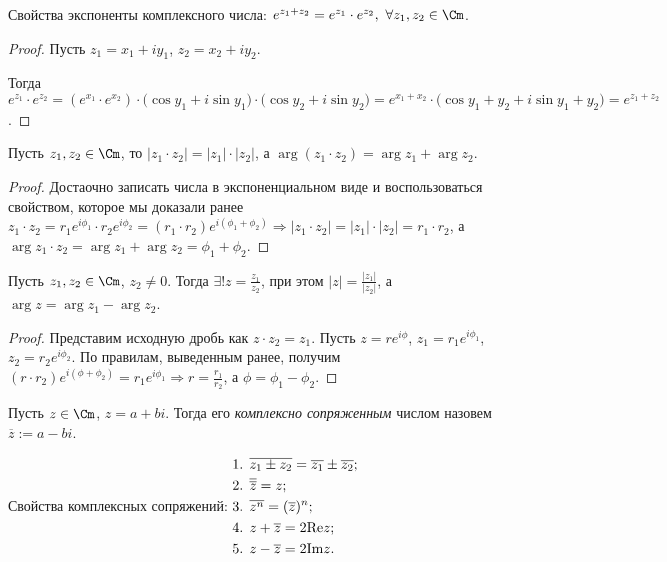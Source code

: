 Свойства экспоненты комплексного числа:
$e^{z_{1} + z_{2}} = e^{z_{1}} \cdot e^{z_{2}}, \  \forall z_{1}, z_{2} \in \Cm$.
\begin{proof}
    Пусть $z_{1} = x_{1} + i y_{1}$, $z_{2} = x_{2} + i y_{2}$.
    
    Тогда $e^{z_{1}} \cdot e^{z_{2}} = (e^{x_{1}} \cdot e^{x_{2}}) \cdot \big( \cos{y_{1}} + i \sin{y_{1}} \big) \cdot \big( \cos{y_{2}} + i \sin{y_{2}} \big) = e^{x_{1} + x_{2}} \cdot \big( \cos{y_{1} + y_{2}} + i \sin{y_{1} + y_{2}} \big) = e^{z_{1} + z_{2}}$.
\end{proof}
\begin{corollary}
    Пусть $z_{1}, z_{2} \in \Cm$, то $|z_{1} \cdot z_{2}| = |z_{1}| \cdot |z_{2}|$, а $\arg{(z_{1} \cdot z_{2})} = \arg{z_{1}} + \arg{z_{2}}$.
\end{corollary}
\begin{proof}
    Достаочно записать числа в экспоненциальном виде и воспользоваться свойством, которое мы доказали ранее $z_{1} \cdot z_{2} = r_{1} e^{i \phi_{1}} \cdot r_{2} e^{i \phi_{2}} = (r_{1} \cdot r_{2}) e^{i (\phi_{1} + \phi_{2})} \Rightarrow |z_{1} \cdot z_{2}| = |z_{1}| \cdot |z_{2}| = r_{1} \cdot r_{2}$, а $\arg{z_{1} \cdot z_{2}} = \arg{z_{1}} + \arg{z_{2}} = \phi_{1} + \phi_{2}$.
\end{proof}
\begin{corollary}
    Пусть $z_{1}, z_{2} \in \Cm$, $z_{2} \neq 0$. Тогда $\displaystyle \exists! z = \frac{z_{1}}{z_{2}}$, при этом $\displaystyle |z| = \frac{|z_{1}|}{|z_{2}|}$, а $\arg{z} = \arg{z_{1}} - \arg{z_{2}}$.
\end{corollary}
\begin{proof}
    Представим исходную дробь как $z \cdot z_{2} = z_{1}$. Пусть $z = r e^{i \phi}$, $z_{1} = r_{1} e^{i \phi_{1}}$, $z_{2} = r_{2} e^{i \phi_{2}}$. По правилам, выведенным ранее, получим $(r \cdot r_{2}) e^{i (\phi + \phi_{2})} = r_{1} e^{i \phi_{1}} \Rightarrow r = \frac{r_{1}}{r_{2}}$, а $\phi = \phi_{1} - \phi_{2}$.
\end{proof}
\begin{definition}
    Пусть $z \in \Cm$, $z = a + bi$. Тогда его \textit{комплексно сопряженным} числом назовем $\overline{z} := a - bi$.
\end{definition}
Свойства комплексных сопряжений: \quad
$\begin{gathered}
    \text{1. } \overline{z_{1} \pm z_{2}} = \overline{z_{1}} \pm \overline{z_{2}}; \hfill \\
    \text{2. } \overline{\overline{z}} = z; \hfill \\
    \text{3. } \overline{z^{n}} = (\overline{z})^{n}; \hfill \\
    \text{4. } z + \overline{z} = 2 \text{Re}z; \hfill \\
    \text{5. } z - \overline{z} = 2 \text{Im}z. \hfill
\end{gathered}$

